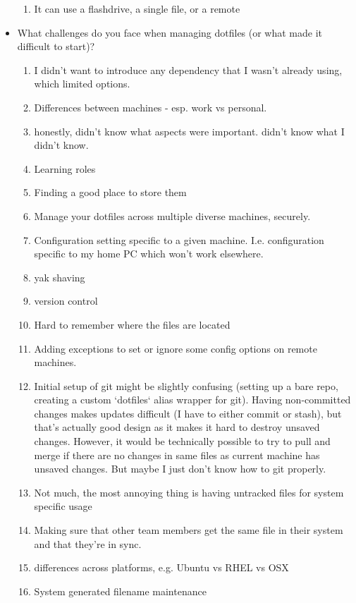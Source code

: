 \documentclass[letterpaper]{jdf}
\begin{document}
\begin{itemize}
\begin{enumerate}
        \item It can use a flashdrive, a single file, or a remote
    \end{enumerate}
    \item What challenges do you face when managing dotfiles (or what made it difficult to start)?
    \begin{enumerate}
        \item I didn't want to introduce any dependency that I wasn't already using, which limited options.
        \item Differences between machines - esp. work vs personal.
        \item honestly, didn't know what aspects were important. didn't know what I didn't know.
        \item Learning roles
        \item Finding a good place to store them
        \item Manage your dotfiles across multiple diverse machines, securely.
        \item Configuration setting specific to a given machine. I.e. configuration specific to my home PC which won't work elsewhere.
        \item yak shaving
        \item version control
        \item Hard to remember where the files are located
        \item Adding exceptions to set or ignore some config options on remote machines.
        \item Initial setup of git might be slightly confusing (setting up a bare repo, creating a custom `dotfiles` alias wrapper for git). Having non-committed changes makes updates difficult (I have to either commit or stash), but that's actually good design as it makes it hard to destroy unsaved changes. However, it would be technically possible to try to pull and merge if there are no changes in same files as current machine has unsaved changes. But maybe I just don't know how to git properly.
        \item Not much, the most annoying thing is having untracked files for system specific usage
        \item Making sure that other team members get the same file in their system and that they're in sync.
        \item differences across platforms, e.g. Ubuntu vs RHEL vs OSX
        \item System generated filename maintenance

\end{enumerate}
\end{itemize}
\end{document}

